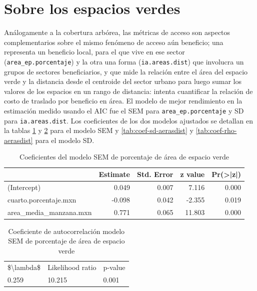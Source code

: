 \documentclass[12pt,]{book}
\begin{document}
\section{Sobre los espacios verdes}\label{sobre-los-espacios-verdes}

Análogamente a la cobertura arbórea, las métricas de acceso son aspectos
complementarios sobre el mismo fenómeno de acceso aún beneficio; una
representa un beneficio local, para el que vive en ese sector
(\texttt{area\_ep.porcentaje}) y la otra una forma
(\texttt{ia.areas.dist}) que involucra un grupos de sectores
beneficiarios, y que mide la relación entre el área del espacio verde y
la distancia desde el centroide del sector urbano para luego sumar los
valores de los espacios en un rango de distancia: intenta cuantificar la
relación de costo de traslado por beneficio en área. El modelo de mejor
rendimiento en la estimación medido usando el AIC fue el SEM para
\texttt{area\_ep.porcentaje} y SD para \texttt{ia.areas.dist}. Los
coeficientes de los dos modelos ajustados se detallan en la tablas
\ref{tab:coef-sem-areaep} y \ref{tab:coef-lambda-areaep} para el modelo
SEM y \ref{tab:coef-sd-aerasdist} y \ref{tab:coef-rho-aerasdist} para el
modelo SD.

\begin{table}

\caption{\label{tab:coef-sem-areaep}Coeficientes del modelo SEM de porcentaje de área de espacio verde}
\centering
\begin{tabular}[t]{lrrrr}
\toprule
  & Estimate & Std. Error & z value & Pr(>|z|)\\
\midrule
(Intercept) & 0.049 & 0.007 & 7.116 & 0.000\\
cuarto.porcentaje.mxn & -0.098 & 0.042 & -2.355 & 0.019\\
area\_media\_manzana.mxn & 0.771 & 0.065 & 11.803 & 0.000\\
\bottomrule
\end{tabular}
\end{table}\begin{table}

\caption{\label{tab:coef-lambda-areaep}Coeficiente de autocorrelación modelo SEM de porcentaje de área de espacio verde}
\centering
\begin{tabular}[t]{lll}
\toprule
\$\textbackslash{}lambda\$ & Likelihood ratio & p-value\\
0.259 & 10.215 & 0.001\\
\bottomrule
\end{tabular}
\end{table}
\end{document}

